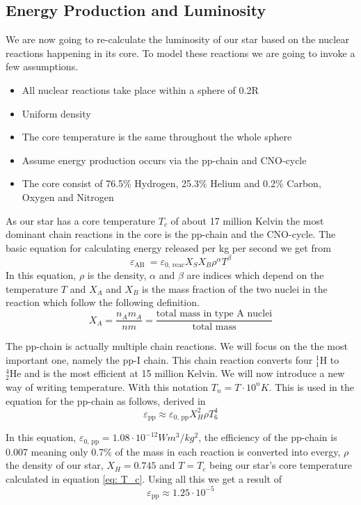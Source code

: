 \documentclass[reprint,english,notitlepage]{revtex4-2}
\begin{document}
\subsection{Energy Production and Luminosity}
We are now going to re-calculate the luminosity of our star based on the nuclear reactions happening in its core. To model these reactions we are going to invoke a few assumptions. 
\begin{itemize}
  \item All nuclear reactions take place within a sphere of 0.2R 
  \item Uniform density
  \item The core temperature is the same throughout the whole sphere
  \item Assume energy production occurs via the pp-chain and CNO-cycle
  \item The core consist of 76.5\% Hydrogen, 25.3\% Helium and 0.2\% Carbon, Oxygen and Nitrogen 
\end{itemize}
As our star has a core temperature $ T_c $ of about 17 million Kelvin the most dominant chain reactions in the core is the pp-chain and the CNO-cycle. The basic equation for calculating energy released per kg per second we get from%
\begin{equation}\label{eq: chain reaction}
  ε_{\text{AB }} = ε_{\text{0, reac}} X_{S} X_{B} ρ^{α} T^{β}
\end{equation}
In this equation, $ \rho $ is the density, $ \alpha $ and $ \beta $ are indices which depend on the temperature $ T $ and $ X_{A} $ and $ X_{B} $ is the mass fraction of the two nuclei in the reaction which follow the following definition.
\[
X_{A} = \frac{n_{A}m_{A}}{nm} = \frac{\text{total mass in type A nuclei}}{\text{total mass}}
\]

The pp-chain is actually multiple chain reactions. We will focus on the the most important one, namely the pp-I chain. This chain reaction converts four $ _{1}^{1}\text{H} $ to $ _{2}^{4}\text{He} $ and is the most efficient at 15 million Kelvin. We will now introduce a new way of writing temperature. With this notation $ T_{n} = T ⋅ 10^{n}K $. This is used in the equation for the pp-chain as follows, derived in%
\begin{equation}\label{eq: pp-chain}
  ε_{\text{pp}} ≈ ε_{\text{0, pp}}X^{2}_{H}ρ T^{4}_{6}
\end{equation}

In this equation, $ ε_{\text{0, pp}} = 1.08 ⋅ 10^{-12}Wm^{3} / kg^{2} $, the efficiency of the pp-chain is 0.007 meaning only 0.7\% of the mass in each reaction is converted into evergy, $ ρ $ the density of our star, $ X_{H} = 0.745$ and $ T = T_c $ being our star's core temperature calculated in equation \ref{eq: T_c}. Using all this we get a result of 
\begin{equation}\label{eq: E_pp}
  ε_{\text{pp}} ≈ 1.25 ⋅ 10^{-5}
\end{equation}
\end{document}
